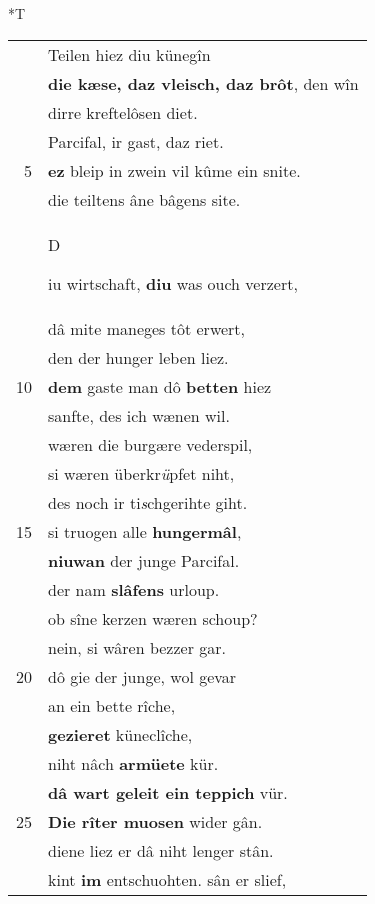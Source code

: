 \documentclass[8pt,a4paper,notitlepage]{article}
\begin{document}
\begin{table}[ht]
\begin{minipage}[t]{0.5\linewidth}
\end{minipage}
\hspace{0.5cm}
\begin{minipage}[t]{0.5\linewidth}
\small
\begin{center}*T
\end{center}
\begin{tabular}{rl}
 & Teilen hiez diu künegîn\\ 
 & \textbf{die kæse, daz vleisch, daz brôt}, den wîn\\ 
 & dirre kreftelôsen diet.\\ 
 & Parcifal, ir gast, daz riet.\\ 
5 & \textbf{ez} bleip in zwein vil kûme ein snite.\\ 
 & die teiltens âne bâgens site.\\ 
 & \begin{large}D\end{large}iu wirtschaft, \textbf{diu} was ouch verzert,\\ 
 & dâ mite maneges tôt erwert,\\ 
 & den der hunger leben liez.\\ 
10 & \textbf{dem} gaste man dô \textbf{betten} hiez\\ 
 & sanfte, des ich wænen wil.\\ 
 & wæren die burgære vederspil,\\ 
 & si wæren überkr\textit{ü}pfet niht,\\ 
 & des noch ir ti\textit{s}chgerihte giht.\\ 
15 & si truogen alle \textbf{hungermâl},\\ 
 & \textbf{niuwan} der junge Parcifal.\\ 
 & der nam \textbf{slâfens} urloup.\\ 
 & ob sîne kerzen wæren schoup?\\ 
 & nein, si wâren bezzer gar.\\ 
20 & dô gie der junge, wol gevar\\ 
 & an ein bette rîche,\\ 
 & \textbf{gezieret} küneclîche,\\ 
 & niht nâch \textbf{armüete} kür.\\ 
 & \textbf{dâ wart geleit ein teppich} vür.\\ 
25 & \textbf{Die rîter muosen} wider gân.\\ 
 & diene liez er dâ niht lenger stân.\\ 
 & kint \textbf{im} entschuohten. sân er slief,\\ 

\end{tabular}
\end{minipage}
\end{table}
\end{document}
